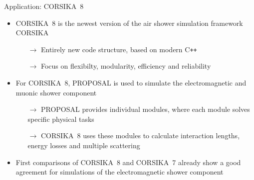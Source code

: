 \documentclass[t]{beamer}
\newlength{\thirdtextwidth}
\newlength{\itemseparation}
\begin{document}
  \begin{columns}[onlytextwidth]%
    \begin{column}{\thirdtextwidth}%
      \begin{block}[equal height group=B]{Application: CORSIKA~8}%
              \begin{itemize}
                \setlength\itemsep{\itemseparation}
                \item CORSIKA~8 is the newest version of the air shower simulation framework CORSIKA
                \begin{itemize}
                  \setlength\itemsep{\itemseparation}
                  \item[$\rightarrow$] Entirely new code structure, based on modern C\texttt{++} 
                  \item[$\rightarrow$] Focus on flexibilty, modularity, efficiency and reliability \cite{Engel2018}
                \end{itemize}
                \item For CORSIKA~8, PROPOSAL is used to simulate the electromagnetic and muonic shower component
                \begin{itemize}
                  \setlength\itemsep{\itemseparation}
                  \item[$\rightarrow$] PROPOSAL provides individual modules, where each module solves specific physical tasks \cite{Alameddine_2020}
                  \item[$\rightarrow$] CORSIKA~8 uses these modules to calculate interaction lengths, energy losses and multiple scattering 
                \end{itemize}
                \item First comparisons of CORSIKA~8 and CORSIKA~7 already show a good agreement for simulations of the electromagnetic shower component \cite{Alameddine:2021iq}
              \end{itemize}

        \vspace{1em}


\end{block}
\end{column}
\end{columns}
\end{document}
